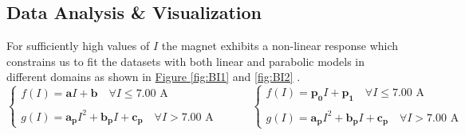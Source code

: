 \documentclass[a4paper,12pt,abstracton]{scrartcl}
\begin{document}
\subsection{Data Analysis \& Visualization}
For sufficiently high values of $I$ the magnet exhibits a non-linear response which constrains us to fit the datasets with both linear and parabolic models in different domains as shown in \hyperref[fig:BI1]{Figure \ref*{fig:BI1}}  and \hyperref[fig:BI2]{ \ref*{fig:BI2}} .
$$
\begin{cases}
f(I)=\boldsymbol{a} I + \boldsymbol{b} \quad \forall I \leq 7.00  \text{ A} \\ \\
g(I)= \boldsymbol{a_p}I^2 + \boldsymbol{b_p}I + \boldsymbol{c_p} \quad \forall I > 7.00 \text{ A}
\end{cases}
\qquad\quad
\begin{cases}
f(I)=\boldsymbol{p_0} I + \boldsymbol{p_1} \quad \forall I \leq 7.00  \text{ A} \\ \\
g(I)= \boldsymbol{a_p}I^2 + \boldsymbol{b_p}I + \boldsymbol{c_p} \quad \forall I > 7.00  \text{ A}
\end{cases}
$$
\end{document}
